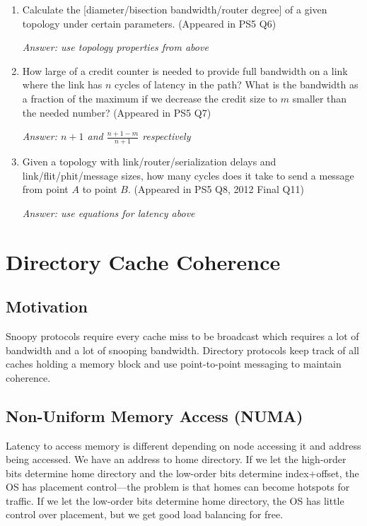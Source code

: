\documentclass{article}
\begin{document}
\begin{enumerate}

\item Calculate the [diameter/bisection bandwidth/router degree] of a given topology under certain parameters. (Appeared in PS5 Q6)

\textit{Answer: use topology properties from above}

\item How large of a credit counter is needed to provide full bandwidth on a link where the link has $n$ cycles of latency in the path? What is the bandwidth as a fraction of the maximum if we decrease the credit size to $m$ smaller than the needed number? (Appeared in PS5 Q7)

\textit{Answer: $n + 1$ and $\frac{n+1-m}{n+1}$ respectively}

\item Given a topology with link/router/serialization delays and link/flit/phit/message sizes, how many cycles does it take to send a message from point $A$ to point $B$. (Appeared in PS5 Q8, 2012 Final Q11)

\textit{Answer: use equations for latency above}

\end{enumerate}

\section{Directory Cache Coherence}

\subsection{Motivation}

Snoopy protocols require every cache miss to be broadcast which requires a lot of bandwidth and a lot of snooping bandwidth. Directory protocols keep track of all caches holding a memory block and use point-to-point messaging to maintain coherence.

\subsection{Non-Uniform Memory Access (NUMA)}

Latency to access memory is different depending on node accessing it and address being accessed. We have an address to home directory. If we let the high-order bits determine home directory and the low-order bits determine index+offset, the OS has placement control---the problem is that homes can become hotspots for traffic. If we let the low-order bits determine home directory, the OS has little control over placement, but we get good load balancing for free.
\end{document}
